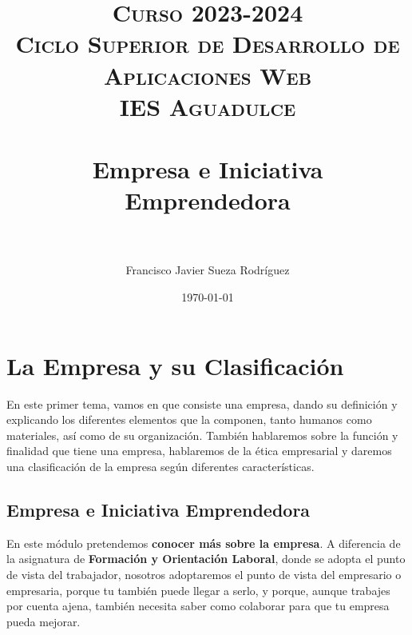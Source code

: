 


\title{
\normalfont \normalsize
\textsc{{\bfseries Curso 2023-2024} \\ Ciclo Superior de Desarrollo de Aplicaciones Web \\ IES Aguadulce} \\ [25pt]
\horrule{0.5pt} \\[0.4cm]
\huge Empresa e Iniciativa Emprendedora \\
\horrule{0.5pt} \\[0.4cm]
}

\author{Francisco Javier Sueza Rodríguez}
\date{\normalsize\today}

\makeglossaries
{}



\maketitle

\newpage

\tableofcontents

\listoffigures


\newpage

\chapter{La Empresa y su Clasificación}
En este primer tema, vamos en que consiste una empresa, dando su definición y explicando los diferentes elementos que la componen, tanto humanos como materiales, así como de su organización. También hablaremos sobre la función y finalidad que tiene una empresa, hablaremos de la ética empresarial y daremos una clasificación de la empresa según diferentes características.

\section{Empresa e Iniciativa Emprendedora}
En este módulo pretendemos \textbf{conocer más sobre la empresa}. A diferencia de la asignatura de \textbf{Formación y Orientación Laboral}, donde se adopta el punto de vista del trabajador, nosotros adoptaremos el punto de vista del empresario o empresaria, porque tu también puede llegar a serlo, y porque, aunque trabajes por cuenta ajena, también necesita saber como colaborar para que tu empresa pueda mejorar.

